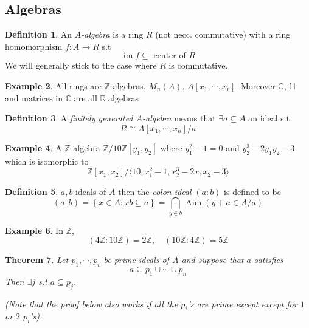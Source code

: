\documentclass[11pt,a4paper]{article}
\theoremstyle{definition}
\newtheorem{definition}{Definition}[section]
\newtheorem{example}[definition]{Example}
\theoremstyle{plain}
\newtheorem{theorem}[definition]{Theorem}
\theoremstyle{remark}
\newcommand{\R}{\mathbb{R}}
\newcommand{\Z}{\mathbb{Z}}
\newcommand{\C}{\mathbb{C}}
\renewcommand{\set}[1]{\left\{ #1 \right\}}
\newcommand{\angles}[1]{\langle #1 \rangle}
\begin{document}
\subsection{Algebras} 
\begin{definition}
    An \emph{$A$-algebra} is a ring $R$ (not necc. commutative) with a ring homomorphism $f \colon A \to R$ s.t 
    $$\operatorname{im} f \subseteq \text{ center of } R$$
    We will generally stick to the case where $R$ is commutative. 
\end{definition}

\begin{example}
    All rings are $\Z$-algebras, $M_n(A)$, $A[x_1, \cdots, x_r]$. Moreover $\C$, $\mathbb{H}$ and matrices in $\C$ are all $\R$ algebras
\end{example}

\begin{definition}
    A \emph{finitely generated $A$-algebra} means that $\exists a \subseteq A$ an ideal s.t 
    $$R \cong A[x_1, \cdots,x_n] / a$$
\end{definition}

\begin{example}
    A $\Z$-algebra $\Z / 10 \Z [y_1, y_2]$ where $y_1^2 - 1 = 0$ and $y_2^3 - 2 y_1 y_2 - 3$ 
    which is isomorphic to 
    $$\Z [x_1, x_2] / \angles{10, x_1^2 - 1, x_2^3 - 2x, x_2 - 3}$$
\end{example}

\begin{definition}
    $a, b$ ideals of $A$ then the \emph{colon ideal} $(a \colon b)$ is defined to be 
    $$(a \colon b) = \set{x \in A \colon x b \subseteq a} = \bigcap_{y \in b} \operatorname{Ann} (y + a \in A / a)$$
\end{definition}

\begin{example}
    In $\Z$, 
    $$(4 \Z \colon 10 \Z) = 2 \Z, \quad (10 \Z \colon 4 \Z) = 5 \Z$$
\end{example}

\begin{theorem}
    Let $p_1, \cdots, p_r$ be prime ideals of $A$ and suppose that $a$ satisfies 
    $$a \subseteq p_1 \cup \cdots \cup p_n$$
    Then $\exists j$ s.t $a \subseteq p_j$.

    (Note that the proof below also works if all the $p_i$'s are prime except except for $1$ or $2$ $p_i$'s).
\end{theorem}
\end{document}
